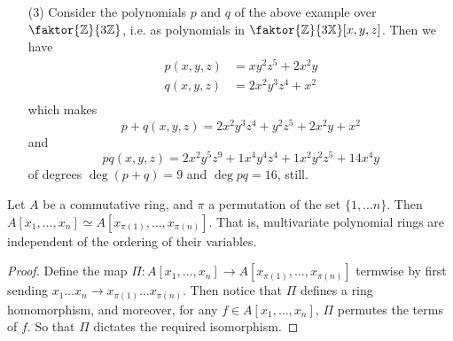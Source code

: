 \begin{example}
\begin{enumerate}
        \item[(3)] Consider the polynomials $p$ and $q$ of the above example
            over  $\faktor{\Z}{3\Z}$, i.e. as polynomials in
            $\faktor{\Z}{3\X}[x,y,z]$. Then we have
            \begin{align*}
                p(x,y,z)    &=  xy^2z^5+2x^2y    \\
                q(x,y,z)    &=  2x^2y^3z^4+x^2  \\
            \end{align*}
            which makes
            \begin{equation*}
                p+q(x,y,z)=2x^2y^3z^4+y^2z^5+2x^2y+x^2
            \end{equation*}
            and
            \begin{equation*}
                pq(x,y,z)=2x^2y^5z^9+1x^4y^4z^4+1x^2y^2z^5+14x^4y
            \end{equation*}
            of degrees $\deg{(p+q)}=9$ and $\deg{pq}=16$, still.
    \end{enumerate}
\end{example}

\begin{lemma}\label{1.11.3}
    Let $A$ be a commutative ring, and  $\pi$ a permutation of the set  $\{1,
    \dots n\}$. Then $A[x_1, \dots, x_n] \simeq A[x_{\pi(1)}, \dots,
    x_{\pi(n)}]$. That is, multivariate polynomial rings are independent of the
    ordering of their variables.
\end{lemma}
\begin{proof}
    Define the map $\Pi:A[x_1, \dots, x_n] \xrightarrow{} A[x_{\pi(1)}, \dots,
    x_{\pi(n)}]$ termwise by first sending $x_1 \dots x_n \xrightarrow{}
    x_{\pi(1)} \dots x_{\pi(n)}$. Then notice that $\Pi$ defines a ring
    homomorphism, and moreover, for any  $f \in A[x_1, \dots, x_n]$, $\Pi$
    permutes the terms of $f$. So that  $\Pi$ dictates the required isomorphism.
\end{proof}

